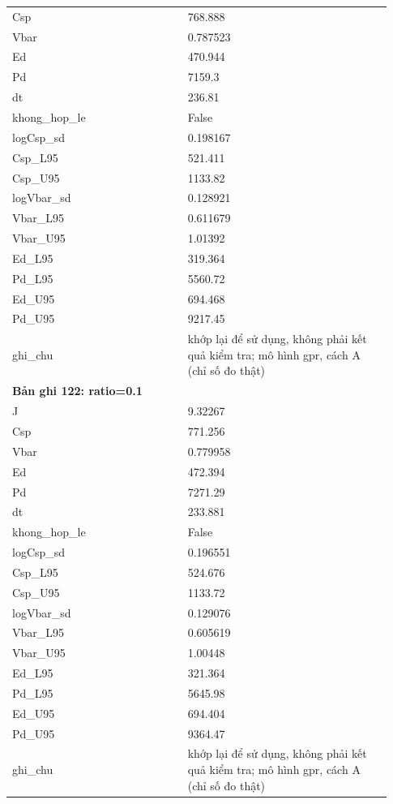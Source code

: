 \begin{longtable}{p{0.43\linewidth}p{0.50\linewidth}}
Csp & 768.888 \\
Vbar & 0.787523 \\
Ed & 470.944 \\
Pd & 7159.3 \\
dt & 236.81 \\
khong\_\allowbreak hop\_\allowbreak le & False \\
logCsp\_\allowbreak sd & 0.198167 \\
Csp\_\allowbreak L95 & 521.411 \\
Csp\_\allowbreak U95 & 1133.82 \\
logVbar\_\allowbreak sd & 0.128921 \\
Vbar\_\allowbreak L95 & 0.611679 \\
Vbar\_\allowbreak U95 & 1.01392 \\
Ed\_\allowbreak L95 & 319.364 \\
Pd\_\allowbreak L95 & 5560.72 \\
Ed\_\allowbreak U95 & 694.468 \\
Pd\_\allowbreak U95 & 9217.45 \\
ghi\_\allowbreak chu & khớp lại để sử dụng, không phải kết quả kiểm tra; mô hình gpr, cách A (chỉ số đo thật) \\
\midrule
\multicolumn{2}{p{0.95\linewidth}}{\textbf{Bản ghi 122: ratio=0.1}} \\
J & 9.32267 \\
Csp & 771.256 \\
Vbar & 0.779958 \\
Ed & 472.394 \\
Pd & 7271.29 \\
dt & 233.881 \\
khong\_\allowbreak hop\_\allowbreak le & False \\
logCsp\_\allowbreak sd & 0.196551 \\
Csp\_\allowbreak L95 & 524.676 \\
Csp\_\allowbreak U95 & 1133.72 \\
logVbar\_\allowbreak sd & 0.129076 \\
Vbar\_\allowbreak L95 & 0.605619 \\
Vbar\_\allowbreak U95 & 1.00448 \\
Ed\_\allowbreak L95 & 321.364 \\
Pd\_\allowbreak L95 & 5645.98 \\
Ed\_\allowbreak U95 & 694.404 \\
Pd\_\allowbreak U95 & 9364.47 \\
ghi\_\allowbreak chu & khớp lại để sử dụng, không phải kết quả kiểm tra; mô hình gpr, cách A (chỉ số đo thật) \\

\end{longtable}
